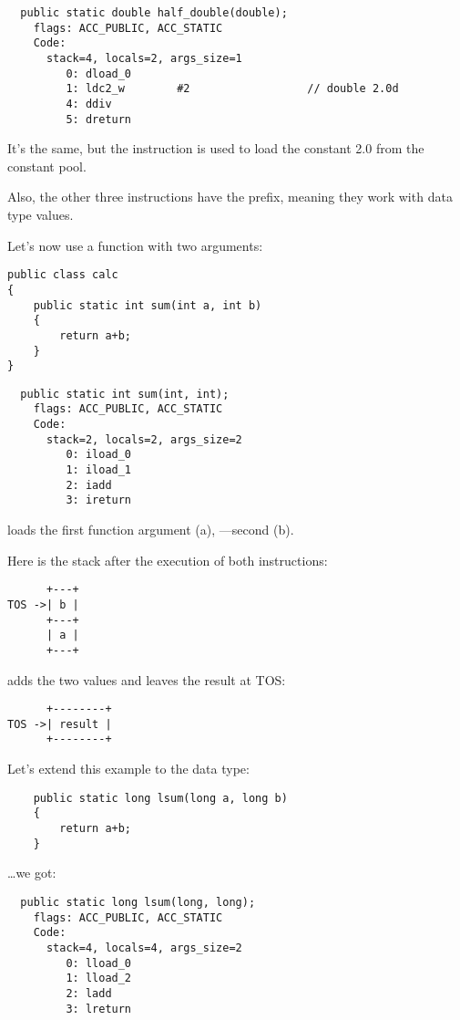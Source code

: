 \begin{lstlisting}
  public static double half_double(double);
    flags: ACC_PUBLIC, ACC_STATIC
    Code:
      stack=4, locals=2, args_size=1
         0: dload_0       
         1: ldc2_w        #2                  // double 2.0d
         4: ddiv          
         5: dreturn       
\end{lstlisting}

It's the same, but the  instruction is used to load the constant 
2.0 from the constant pool.

Also, the other three instructions have the  prefix, 
meaning they work with  data type values.


Let's now use a function with two arguments:


\begin{lstlisting}
public class calc
{
	public static int sum(int a, int b)
	{
		return a+b;
	}
}
\end{lstlisting}

\begin{lstlisting}
  public static int sum(int, int);
    flags: ACC_PUBLIC, ACC_STATIC
    Code:
      stack=2, locals=2, args_size=2
         0: iload_0       
         1: iload_1       
         2: iadd          
         3: ireturn       
\end{lstlisting}

 loads the first function argument (a), ---second (b).

Here is the stack after the execution of both instructions:


\begin{lstlisting}
      +---+
TOS ->| b |
      +---+
      | a |
      +---+
\end{lstlisting}

 adds the two values and leaves the result at \ac{TOS}:


\begin{lstlisting}
      +--------+
TOS ->| result |
      +--------+
\end{lstlisting}

Let's extend this example to the  data type:


\begin{lstlisting}
	public static long lsum(long a, long b)
	{
		return a+b;
	}
\end{lstlisting}

\dots we got:

\begin{lstlisting}
  public static long lsum(long, long);
    flags: ACC_PUBLIC, ACC_STATIC
    Code:
      stack=4, locals=4, args_size=2
         0: lload_0       
         1: lload_2       
         2: ladd          
         3: lreturn       
\end{lstlisting}


